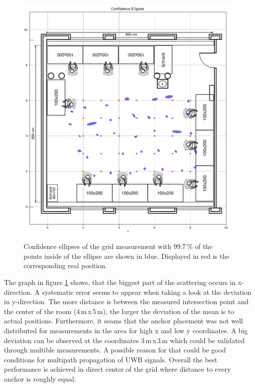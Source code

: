 \documentclass[final, conference, a4paper]{IEEEtran}
\begin{document}
\begin{figure}[hbt!]
	\includegraphics[scale=0.27]{pic/position_plot.png}
	\caption{Confidence ellipses of the grid measurement with 99.7\,\% of the points inside of the ellipse are shown in blue.
	Displayed in red is the corresponding real position.}
	\label{fig:statistics}
\end{figure}

The graph in figure \ref{fig:statistics} shows, that the biggest part of the scattering occurs in x-direction. 
A systematic error seems to appear when taking a look at the deviation in y-direction. 
The more distance is between the measured intersection point and the center of the room (4\,m\,x\,5\,m), the larger the deviation of the mean is to actual positions. 
Furthermore, it seams that the anchor placement was not well distributed for measurements in the area for high x and low y coordinates. 
A big deviation can be observed at the coordinates 3\,m\,x\,3\,m which could be validated through multible measurements.
A possible reason for that could be good conditions for multipath propagation of \ac{UWB} signals.
Overall the best performance is achieved in direct center of the grid where distance to every anchor is roughly equal.
\end{document}
